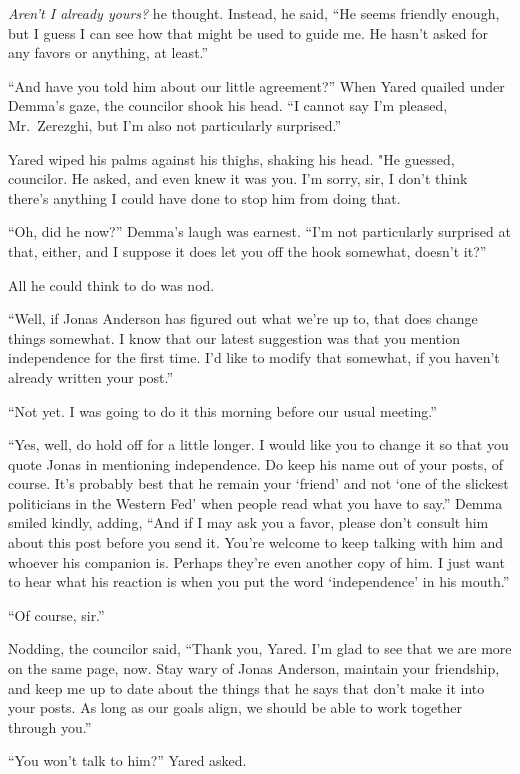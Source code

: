\emph{Aren't I already yours?} he thought. Instead, he said, ``He seems friendly enough, but I guess I can see how that might be used to guide me. He hasn't asked for any favors or anything, at least.''

``And have you told him about our little agreement?'' When Yared quailed under Demma's gaze, the councilor shook his head. ``I cannot say I'm pleased, Mr.~Zerezghi, but I'm also not particularly surprised.''

Yared wiped his palms against his thighs, shaking his head. "He guessed, councilor. He asked, and even knew it was you. I'm sorry, sir, I don't think there's anything I could have done to stop him from doing that.

``Oh, did he now?'' Demma's laugh was earnest. ``I'm not particularly surprised at that, either, and I suppose it does let you off the hook somewhat, doesn't it?''

All he could think to do was nod.

``Well, if Jonas Anderson has figured out what we're up to, that does change things somewhat. I know that our latest suggestion was that you mention independence for the first time. I'd like to modify that somewhat, if you haven't already written your post.''

``Not yet. I was going to do it this morning before our usual meeting.''

``Yes, well, do hold off for a little longer. I would like you to change it so that you quote Jonas in mentioning independence. Do keep his name out of your posts, of course. It's probably best that he remain your `friend' and not `one of the slickest politicians in the Western Fed' when people read what you have to say.'' Demma smiled kindly, adding, ``And if I may ask you a favor, please don't consult him about this post before you send it. You're welcome to keep talking with him and whoever his companion is. Perhaps they're even another copy of him. I just want to hear what his reaction is when you put the word `independence' in his mouth.''

``Of course, sir.''

Nodding, the councilor said, ``Thank you, Yared. I'm glad to see that we are more on the same page, now. Stay wary of Jonas Anderson, maintain your friendship, and keep me up to date about the things that he says that don't make it into your posts. As long as our goals align, we should be able to work together through you.''

``You won't talk to him?'' Yared asked.

